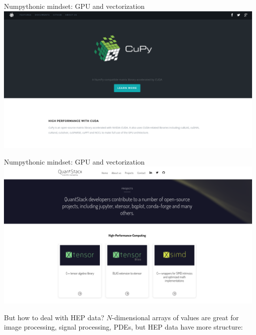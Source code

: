 \documentclass[aspectratio=169]{beamer}
\begin{document}
\begin{frame}{Numpythonic mindset: GPU and vectorization}
\vspace{0.35 cm}
\includegraphics[width=\linewidth]{cupy.png}
\end{frame}

\begin{frame}{Numpythonic mindset: GPU and vectorization}
\vspace{0.35 cm}
\includegraphics[width=\linewidth]{quantstack.png}
\end{frame}

\begin{frame}{But how to deal with HEP data?}
\vspace{0.5 cm}
$N$-dimensional arrays of values are great for image processing, signal processing, PDEs, but HEP data have more structure:




\end{frame}
\end{document}
